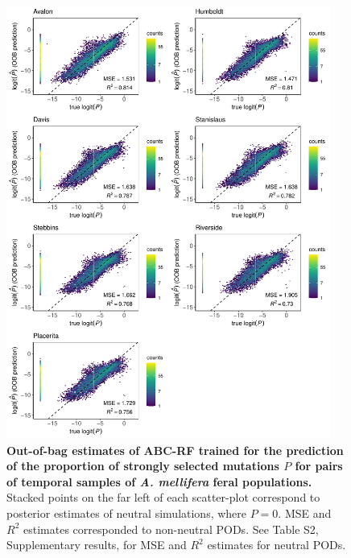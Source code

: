 \documentclass[a4paper, 12pt]{article}
\begin{document}
\begin{figure}[ht]
  \centering
  \includegraphics[width=0.95\textwidth]{Figures/FigureS18_combined_plot_pstrong.pdf}
  \small\caption{\textbf{Out-of-bag estimates of ABC-RF trained for the prediction of the proportion of strongly selected mutations $P$ for pairs of temporal samples of \textit{A. mellifera} feral populations.} Stacked points on the far left of each scatter-plot correspond to posterior estimates of neutral simulations, where $P = 0$. MSE and $R^2$ estimates corresponded to non-neutral PODs. See Table S2, Supplementary results, for MSE and $R^2$ estimates for neutral PODs.}
  \label{fig:supple_feralbee_pstrong}
\end{figure}
\end{document}
